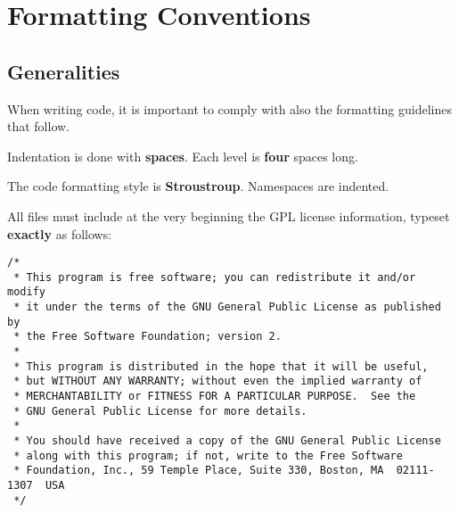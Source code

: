 \documentclass[a4paper]{article}
\begin{document}
\section{Formatting Conventions}
\label{sec:formatting}

\subsection{Generalities}
\label{subsec:generalities}
When writing code, it is important to comply with also the formatting
guidelines that follow.
\begin{warning}
  Indentation is done with {\bf spaces}. Each level is {\bf four} spaces long.
\end{warning}
\begin{warning}
  The code formatting style is {\bf Stroustroup}. Namespaces are indented.
\end{warning}

All files must include at the very beginning the GPL license information,
typeset {\bf exactly} as follows:
\begin{footnotesize}
\begin{verbatim}
/*
 * This program is free software; you can redistribute it and/or modify
 * it under the terms of the GNU General Public License as published by
 * the Free Software Foundation; version 2.
 *
 * This program is distributed in the hope that it will be useful,
 * but WITHOUT ANY WARRANTY; without even the implied warranty of
 * MERCHANTABILITY or FITNESS FOR A PARTICULAR PURPOSE.  See the
 * GNU General Public License for more details.
 *
 * You should have received a copy of the GNU General Public License
 * along with this program; if not, write to the Free Software
 * Foundation, Inc., 59 Temple Place, Suite 330, Boston, MA  02111-1307  USA
 */
\end{verbatim}
\end{footnotesize}
\end{document}
